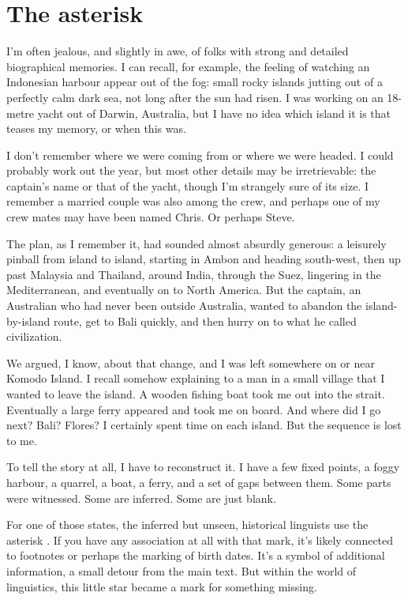 \chapter*{The asterisk}
{}

I'm often jealous, and slightly in awe, of folks with strong and
detailed biographical memories. I can recall, for example, the feeling
of watching an Indonesian harbour appear out of the fog: small rocky
islands jutting out of a perfectly calm dark sea, not long after the sun
had risen. I was working on an 18-metre yacht out of Darwin, Australia,
but I have no idea which island it is that teases my memory, or when this
was.

I don't remember where we were coming from or where we were headed. I could
probably work out the year, but most other details may be irretrievable:
the captain's name or that of the yacht, though I'm strangely sure of
its size. I remember a married couple was also among the crew, and
perhaps one of my crew mates may have been named Chris. Or perhaps
Steve.

The plan, as I remember it, had sounded almost absurdly generous: a
leisurely pinball from island to island, starting in Ambon and heading
south-west, then up past Malaysia and Thailand, around India, through the
Suez, lingering in the Mediterranean, and eventually on to North America.
But the captain, an Australian who had never been outside Australia,
wanted to abandon the island-by-island route, get to Bali quickly, and
then hurry on to what he called civilization.

We argued, I know, about that change, and I was left somewhere on or
near Komodo Island. I recall somehow explaining to a man in a small
village that I wanted to leave the island. A wooden fishing boat took me
out into the strait. Eventually a large ferry appeared and took me on
board. And where did I go next? Bali? Flores? I certainly spent time on
each island. But the sequence is lost to me.

To tell the story at all, I have to reconstruct it. I have a few fixed
points, a foggy harbour, a quarrel, a boat, a ferry, and
a set of gaps between them. Some parts were witnessed. Some are inferred.
Some are just blank.

For one of those states, the inferred but unseen, historical linguists
use the asterisk \mentionhead{*}. If you have any association at all with
that mark, it's likely connected to footnotes or perhaps the marking of
birth dates. It's a symbol of additional information, a small detour from
the main text. But within the world of linguistics, this little star
became a mark for something missing.

